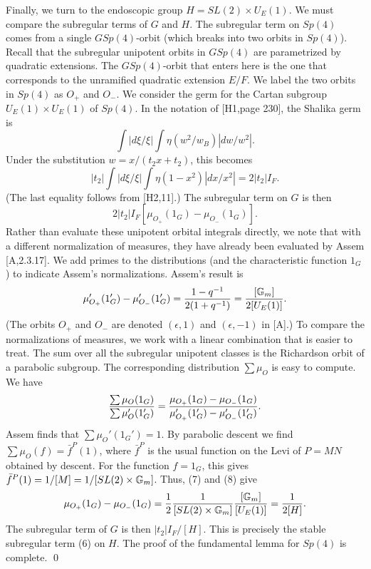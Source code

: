 \documentclass{amsart}
\newcommand\G{{\Bbb G}}
\begin{document}
Finally, we turn to the endoscopic group $H = SL(2) \times U_E(1)$.
We must compare the subregular terms of $G$ and $H$.  The subregular
term on $Sp(4)$ comes from a single $GSp(4)$-orbit (which breaks into
two orbits in $Sp(4)$).  Recall that the subregular unipotent orbits
in $GSp(4)$ are parametrized by quadratic extensions.  The
$GSp(4)$-orbit that enters here is the one that corresponds to the
unramified quadratic extension $E/F$.  We label the two orbits in
$Sp(4)$ as $O_+$ and $O_-$.  We consider the germ for the Cartan
subgroup $U_E(1)\times U_E(1)$ of $Sp(4)$.  In the notation of
[H1,page 230], the Shalika germ is
$$\int|d\xi/\xi| \int \eta(w^2/w_B)|dw/w^2|.$$
Under the substitution $w = x/(t_2 x+t_2)$, this becomes
$$|t_2| \int |d\xi/\xi| 
\int \eta(1-x^2) |dx/x^2| = 2 |t_2| I_F.$$
(The last equality follows from [H2,11].)
The subregular term on $G$ is then 
$$ 2 |t_2| I_F [\mu_{O_+}(1_G) - \mu_{O_-} (1_G)].$$
Rather than evaluate these unipotent orbital integrals directly,
we note that with a different normalization of measures, they
have already been evaluated by Assem [A,2.3.17].  We add primes to
the distributions (and the characteristic function $1_G$) to
indicate Assem's normalizations.  Assem's result is
\begin{equation}\label{eqn:7}
\mu'_{O_+}(1_G') - \mu'_{O_-}(1_G') = {1-q^{-1}\over 2(1+q^{-1})} =
{[\G_m]\over 2[U_E(1)]}.
\end{equation}
(The orbits $O_+$ and $O_-$ are denoted $(\epsilon,1)$
and $(\epsilon,-1)$ in [A].)
To compare the normalizations of measures, we work with a linear
combination that is easier to treat.  The sum over all the subregular
unipotent classes is the Richardson orbit of a parabolic subgroup.
The corresponding distribution $\sum \mu_O$ is easy to compute.
We have
\begin{equation}\label{eqn:8}
{\sum \mu_O (1_G)\over \sum \mu'_O(1'_G)} =
  {\mu_{O_+}(1_G) - \mu_{O_-}(1_G) \over 
   \mu'_{O_+} (1'_G) - \mu'_{O_-} (1'_G)}.
\end{equation}
Assem finds that $\sum\mu_O'(1_G') = 1$.
By parabolic descent we find $\sum\mu_O(f) = \bar f^P(1)$, where
$\bar f^P$ is the usual function on the Levi of $P=MN$ obtained by
descent.  For the function $f = 1_G$, this gives
$\bar f^P(1) = 1/[M] = 1/[SL(2)\times \G_m]$.
Thus, (7) and (8) give
$$\mu_{O_+}(1_G) - \mu_{O_-}(1_G) = 
  {1\over 2} {1 \over [SL(2)\times \G_m]} {[\G_m]\over [U_E(1)]} =
{1\over 2[H]}.$$
The subregular term of $G$ is then
$|t_2|I_F/[H]$.  This is precisely the stable subregular 
term (6)
on $H$.  The proof of the fundamental lemma 
for $Sp(4)$ is complete. \qed
\end{document}
